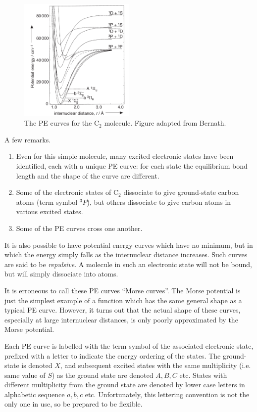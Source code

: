 \documentclass{article}
\theoremstyle{plain}\theoremheaderfont{\normalfont\itshape}\theorembodyfont{\rmfamily}\theoremseparator{.}\newtheorem*{rem}{Remark}\newtheorem*{ex}{Example}\newtheorem*{proof}{Proof}\newtheorem*{altp}{Alternative proof}
\theoremstyle{plain}\theoremheaderfont{\normalfont\bfseries}\theorembodyfont{\rmfamily}\theoremseparator{.}\newtheorem{thm}{Theorem}[section]\newtheorem{lem}[thm]{Lemma}\newtheorem{prop}[thm]{Proposition}\newtheorem*{cor}{Corollary}\newtheorem{defn}[thm]{Definition}\newtheorem{clm}[thm]{Claim}\newtheorem{clminproof}{Claim}\newtheorem{pos}{Postulate}[section]
\theoremstyle{break}\theoremheaderfont{\normalfont\itshape}\theorembodyfont{\rmfamily}\theoremseparator{.\medskip}\newtheorem*{proofskip}{Proof}\newtheorem*{exs}{Examples}\newtheorem*{rems}{Remarks}
\theoremstyle{break}\theoremheaderfont{\normalfont\bfseries}\theorembodyfont{\rmfamily}\theoremseparator{.\medskip}\newtheorem{lemskip}[thm]{Lemma}\newtheorem{defnskip}[thm]{Definition}\newtheorem{propskip}[thm]{Proposition}\newtheorem{thmskip}[thm]{Theorem}
\numberwithin{equation}{section}
\begin{document}
    \begin{figure}
        \centering
        \includegraphics[width=0.5\textwidth]{PE_curve.png}
        \caption{The PE curves for the \(\mathrm{C_2}\) molecule. Figure adapted from Bernath.}
    \end{figure}

    A few remarks.
    \begin{enumerate}[topsep=0pt,label=(\roman*)]
        \item Even for this simple molecule, many excited electronic states have been identified, each with a unique PE curve: for each state the equilibrium bond length and the shape of the curve are different.
        \item Some of the electronic states of \(\mathrm{C_2}\) dissociate to give ground-state carbon atoms (term symbol \(^3P\)), but others dissociate to give carbon atoms in various excited states.
        \item  Some of the PE curves cross one another.
    \end{enumerate}

    It is also possible to have potential energy curves which have no minimum, but in which the energy simply falls as the internuclear distance increases. Such curves are said to be \textit{repulsive}. A molecule in such an electronic state will not be bound, but will simply dissociate into atoms.

    It is erroneous to call these PE curves ``Morse curves''. The Morse potential is just the simplest example of a function which has the same general shape as a typical PE curve. However, it turns out that the actual shape of these curves, especially at large internuclear distances, is only poorly approximated by the Morse potential.

    Each PE curve is labelled with the term symbol of the associated electronic state, prefixed with a letter to indicate the energy ordering of the states. The ground-state is denoted \(X\), and subsequent excited states with the same multiplicity (i.e. same value of \(S\)) as the ground state are denoted \(A,B,C\) etc. States with different multiplicity from the ground state are denoted by lower case letters in alphabetic sequence \(a,b,c\) etc. Unfortunately, this lettering convention is not the only one in use, so be prepared to be flexible.
\end{document}
